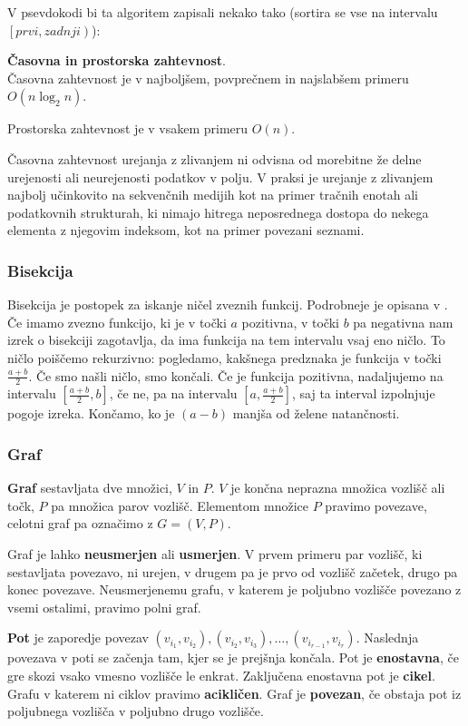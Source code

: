 \documentclass[a4paper,oneside]{article}
\begin{document}
V psevdokodi bi ta algoritem zapisali nekako tako (sortira se vse na intervalu
$\left[prvi, zadnji\right)$):


\textbf{Časovna in prostorska zahtevnost}. \\
Časovna zahtevnost je v najboljšem, povprečnem in najslabšem primeru $O(n\log_2 n)$.

Prostorska zahtevnost je v vsakem primeru $O(n)$. %

Časovna zahtevnost urejanja z zlivanjem ni odvisna od morebitne že delne urejenosti ali
neurejenosti podatkov v polju. V praksi je urejanje z zlivanjem najbolj učinkovito na
sekvenčnih medijih kot na primer tračnih enotah ali podatkovnih strukturah, ki nimajo hitrega
neposrednega dostopa do nekega elementa z njegovim indeksom, kot na primer povezani seznami.

\subsubsection{Bisekcija}
Bisekcija je postopek za iskanje ničel zveznih funkcij. Podrobneje je opisana v
\cite{bib:bohte91}.
Če imamo zvezno funkcijo, ki je v točki $a$ pozitivna, v točki $b$ pa
negativna nam izrek o bisekciji zagotavlja, da ima funkcija na tem 
intervalu vsaj eno ničlo. To ničlo poiščemo rekurzivno:
pogledamo, kakšnega predznaka je funkcija v točki $\frac{a+b}{2}$. Če smo našli
ničlo, smo končali. Če je funkcija pozitivna, nadaljujemo na intervalu
$\left[\frac{a+b}{2}, b\right]$, če ne, pa na intervalu $\left[a, \frac{a+b}{2}\right]$, saj ta
interval izpolnjuje pogoje izreka. Končamo, ko je $\left(a-b\right)$ manjša od želene natančnosti.

\subsubsection{Graf}
\textbf{Graf} sestavljata dve množici, $V$ in $P$. $V$ je končna neprazna množica vozlišč
ali točk, $P$ pa množica parov vozlišč. Elementom množice $P$ pravimo povezave, celotni
graf pa označimo z $G = (V, P)$.

Graf je lahko \textbf{neusmerjen} ali \textbf{usmerjen}. V prvem primeru par vozlišč, ki sestavljata
povezavo, ni urejen, v drugem pa je prvo od vozlišč začetek, drugo pa konec povezave.
Neusmerjenemu grafu, v katerem je poljubno vozlišče povezano z vsemi ostalimi, pravimo
polni graf. 

\textbf{Pot} je zaporedje povezav $\left(v_{i_1}, v_{i_2}\right), \left(v_{i_2},
v_{i_3}\right), \ldots, \left(v_{i_{r-1}}, v_{i_r}\right)$. Naslednja povezava v poti se
začenja tam, kjer se je prejšnja končala. Pot je \textbf{enostavna}, če gre skozi vsako
vmesno vozlišče le enkrat. Zaključena enostavna pot je \textbf{cikel}.
Grafu v katerem ni ciklov pravimo \textbf{acikličen}. Graf je \textbf{povezan}, če obstaja
pot iz poljubnega vozlišča v poljubno drugo vozlišče.
\end{document}

